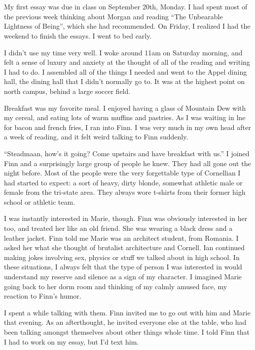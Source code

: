 \section{}

My first essay was due in class on September 20th, Monday.  I had spent most
of the previous week thinking about Morgan and reading ``The Unbearable
Lightness of Being'', which she had recommended.  On Friday, I realized I had
the weekend to finish the essays.  I went to bed early.

I didn't use my time very well.  I woke around 11am on Saturday morning, and
felt a sense of luxury and anxiety at the thought of all of the reading and
writing I had to do.  I assembled all of the things I needed and went to the
Appel dining hall, the dining hall that I didn't normally go to.  It was at the
highest point on north campus, behind a large soccer field.

Breakfast was my favorite meal.  I enjoyed having a glass of Mountain Dew with
my cereal, and eating lots of warm muffins and pastries.  As I was waiting in
lne for bacon and french fries, I ran into Finn.  I was very much in my own head
after a week of reading, and it felt weird talking to Finn suddenly.

``Steadmaan, how's it going?  Come upstairs and have breakfast with us.''  I
joined Finn and a surprisingly large group of people he knew.  They had all gone
out the night before.  Most of the people were the very forgettable type of
Cornellian I had started to expect: a sort of heavy, dirty blonde, somewhat
athletic male or female from the tri-state area.  They always wore t-shirts from
their former high school or athletic team.

I was instantly interested in Marie, though.  Finn was obviously interested in
her too, and treated her like an old friend.  She was wearing a black dress and
a leather jacket.  Finn told me Marie was an architect student, from Romania.  I
asked her what she thought of brutalist architecture and Cornell.  Ian continued
making jokes involving sex, physics or stuff we talked about in high school.  In
these situations, I always felt that the type of person I was interested in
would understand my reserve and silence as a sign of my character.  I imagined
Marie going back to her dorm room and thinking of my calmly amused face, my
reaction to Finn's humor.  

I spent a while talking with them.  Finn invited me to go out with him and Marie
that evening.  As an afterthought, he invited everyone else at the table, who
had been talking amongst themselves about other things whole time.  I told Finn
that I had to work on my essay, but I'd text him.

